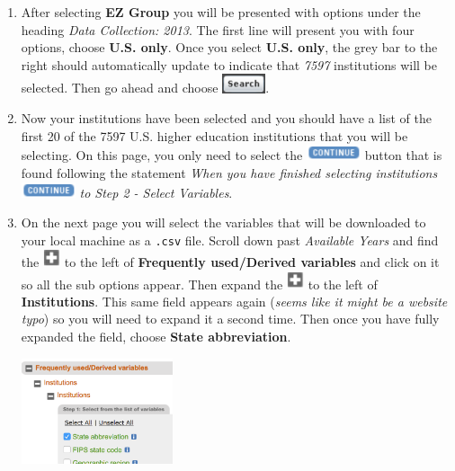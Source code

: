 \documentclass{article}
\newcommand{\code}[1]{\texttt{#1}}
\begin{document}
{\begin{enumerate}[leftmargin=15mm]
\item After selecting \textbf{EZ Group} you will be presented with options under the heading \textit{Data Collection: 2013}.  The first line will present you with four options, choose \textbf{U.S. only}.  Once you select \textbf{U.S. only}, the grey bar to the right should automatically update to indicate that \textit{7597} institutions will be selected.  Then go ahead and choose \includegraphics[width=0.1\textwidth]{search.png}.

\item Now your institutions have been selected and you should have a list of the first 20 of the 7597 U.S. higher education institutions that you will be selecting.  On this page, you only need to select the \includegraphics[width=0.125\textwidth]{continue.png} button that is found following the statement \textit{When you have finished selecting institutions} \includegraphics[width=0.125\textwidth]{continue.png} \textit{to Step 2 - Select Variables}.

\item On the next page you will select the variables that will be downloaded to your local machine as a \code{.csv} file.  Scroll down past \textit{Available Years} and find the \includegraphics[width=0.04\textwidth]{plus.png} to the left of \textbf{Frequently used/Derived variables} and click on it so all the sub options appear.  Then expand the \includegraphics[width=0.04\textwidth]{plus.png} to the left of \textbf{Institutions}.  This same field appears again (\textit{seems like it might be a website typo}) so you will need to expand it a second time.  Then once you have fully expanded the field, choose \textbf{State abbreviation}. \begin{flushright}\includegraphics[width=0.35\textwidth]{state.png} \end{flushright}


\end{enumerate}}
\end{document}
